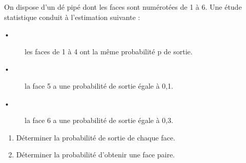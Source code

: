 
On dispose d'un dé pipé dont les faces sont numérotées de 1 à 6. Une étude statistique conduit à l'estimation suivante :
\begin{description}
\item[•] les faces de 1 à 4 ont la même probabilité p de sortie.
\item[•] la face 5 a une probabilité de sortie égale à 0,1.
\item[•] la face 6 a une probabilité de sortie égale à 0,3.
\end{description}
\begin{enumerate}
\item Déterminer la probabilité de sortie de chaque face.
\item Déterminer la probabilité d'obtenir une face paire.
\end{enumerate}